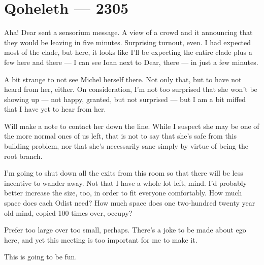 \hypertarget{qoheleth-2305}{%
\chapter*{Qoheleth — 2305}\label{qoheleth-2305}}

Aha! Dear sent a sensorium message. A view of a crowd and it announcing that they would be leaving in five minutes. Surprising turnout, even. I had expected most of the clade, but here, it looks like I'll be expecting the entire clade plus a few here and there — I can see Ioan next to Dear, there — in just a few minutes.

A bit strange to not see Michel herself there. Not only that, but to have not heard from her, either. On consideration, I'm not too surprised that she won't be showing up — not happy, granted, but not surprised — but I am a bit miffed that I have yet to hear from her.

Will make a note to contact her down the line. While I suspect she may be one of the more normal ones of us left, that is not to say that she's safe from this building problem, nor that she's necessarily sane simply by virtue of being the root branch.

I'm going to shut down all the exits from this room so that there will be less incentive to wander away. Not that I have a whole lot left, mind. I'd probably better increase the size, too, in order to fit everyone comfortably. How much space does each Odist need? How much space does one two-hundred twenty year old mind, copied 100 times over, occupy?

Prefer too large over too small, perhaps. There's a joke to be made about ego here, and yet this meeting is too important for me to make it.

This is going to be fun.
